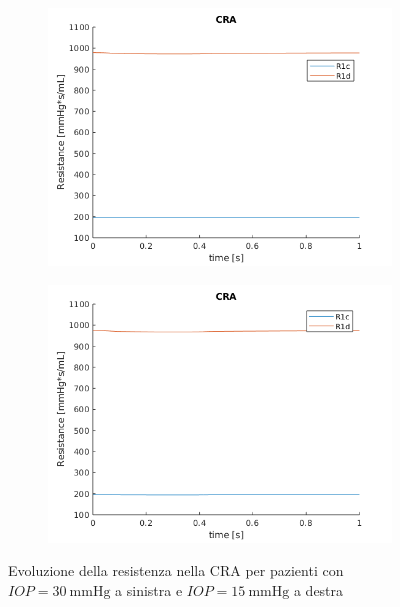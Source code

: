 \documentclass{article}
\begin{document}
\begin{figure}[ht]
\begin{subfigure}{.5\textwidth}
  \centering
  \includegraphics[width=1.0\linewidth]{Pictures/IOP30_part1/CRA_30.png}
\end{subfigure}
\begin{subfigure}{.5\textwidth}
  \centering
  \includegraphics[width=1.0\linewidth]{Pictures/IOP15_part1/CRA_15.png}
\end{subfigure}
\caption{Evoluzione della resistenza nella CRA per pazienti con $IOP = \SI{30}{\mmHg}$ a sinistra e $IOP = \SI{15}{\mmHg}$ a destra}
\label{CRA1530}
\end{figure}
\end{document}
